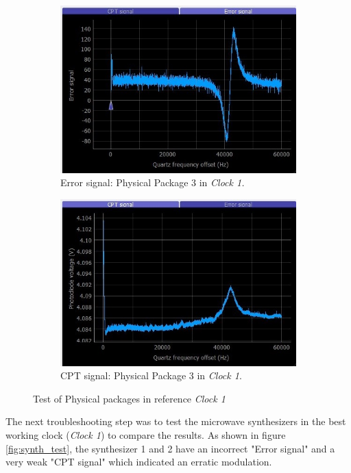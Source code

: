 \documentclass[a4paper,12pt]{article}
\newcounter{step}
\begin{document}
\begin{figure}[!h]
\centering
\begin{subfigure}[b]{0.49\textwidth}
\centering
\includegraphics[height=0.52\textwidth]{Images/c1_pp3_1_2.jpg}
\captionsetup{justification=centering}
\caption{Error signal: Physical Package 3 in \textit{Clock 1.}}
\end{subfigure}
\hfill
\begin{subfigure}[b]{0.49\textwidth}
\centering
\includegraphics[height=0.52\textwidth]{Images/c1_pp3_2_2.jpg}
\captionsetup{justification=centering}
\caption{CPT signal: Physical Package 3 in \textit{Clock 1}.}
\end{subfigure}

\caption{Test of Physical packages in reference \textit{Clock 1}} 
\label{fig:pp_test}
\end{figure}

The next troubleshooting step was to test the microwave synthesizers in the best working clock (\textit{Clock 1}) to compare the results. As shown in figure \ref{fig:synth_test}, the synthesizer 1 and 2 have an incorrect "Error signal" and a very weak "CPT signal" which indicated an erratic modulation.
\end{document}
